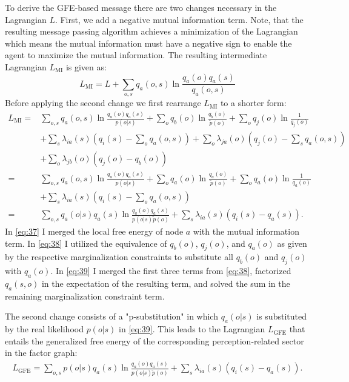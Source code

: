 To derive the GFE-based message there are two changes necessary in the Lagrangian \(L\). First, we add a negative mutual information term. Note, that the resulting message passing algorithm achieves a minimization of the Lagrangian which means the mutual information must have a negative sign to enable the agent to maximize the mutual information. The resulting intermediate Lagrangian \(L_{\text{MI}}\) is given as:
\begin{equation}
    L_{\text{MI}} = L + \sum_{o,s} q_a(o,s) \ln \frac{q_a(o)q_a(s)}{q_a(o,s)}
\end{equation}
Before applying the second change we first rearrange \(L_{\text{MI}}\) to a shorter form:
\begin{align}
    L_{\text{MI}} = & \sum_{o,s} q_a(o,s) \ln \frac{q_a(o)q_a(s)}{p(o|s)} + \sum_o q_b(o) \ln \frac{q_b(o)}{\tilde{p}(o)} + \sum_o q_j(o) \ln \frac{1}{q_j(o)} \nonumber \\
                    & + \sum_s \lambda_{ia}(s) \left( q_i(s) - \sum_o q_a(o,s) \right) + \sum_o \lambda_{ja}(o) \left( q_j(o) - \sum_s q_a(o,s) \right) \nonumber        \\
                    & + \sum_o \lambda_{jb}(o) \left( q_j(o) - q_b(o) \right)       \label{eq:37}                                                                        \\
    =               & \sum_{o,s} q_a(o,s) \ln \frac{q_a(o)q_a(s)}{p(o|s)} + \sum_o q_a(o) \ln \frac{q_a(o)}{\tilde{p}(o)} + \sum_o q_a(o) \ln \frac{1}{q_a(o)} \nonumber \\
                    & + \sum_s \lambda_{ia}(s) \left( q_i(s) - \sum_o q_a(o,s) \right) \label{eq:38}                                                                     \\
    =               & \sum_{o,s} q_a(o|s)q_a(s) \ln \frac{q_a(o)q_a(s)}{p(o|s)\tilde{p}(o)} + \sum_s \lambda_{ia}(s) \left( q_i(s) - q_a(s) \right). \label{eq:39}
\end{align}
In \cref{eq:37} I merged the local free energy of node \(a\) with the mutual information term. In \cref{eq:38} I utilized the equivalence of \(q_b(o)\), \(q_j(o)\), and \(q_a(o)\) as given by the respective marginalization constraints to substitute all \(q_b(o)\) and \(q_j(o)\) with \(q_a(o)\). In \cref{eq:39} I merged the first three terms from \cref{eq:38}, factorized \(q_a(s,o)\) in the expectation of the resulting term, and solved the sum in the remaining marginalization constraint term.

The second change consists of a "p-substitution" in which \(q_a(o|s)\) is substituted by the real likelihood \(p(o|s)\) in \cref{eq:39}. This leads to the Lagrangian \(L_{\text{GFE}}\) that entails the generalized free energy of the corresponding perception-related sector in the factor graph:
\begin{align}
    L_{\text{GFE}} = \sum_{o,s} p(o|s)q_a(s) \ln \frac{q_a(o)q_a(s)}{p(o|s)\tilde{p}(o)} + \sum_s \lambda_{ia}(s) \left( q_i(s) - q_a(s) \right).
\end{align}

